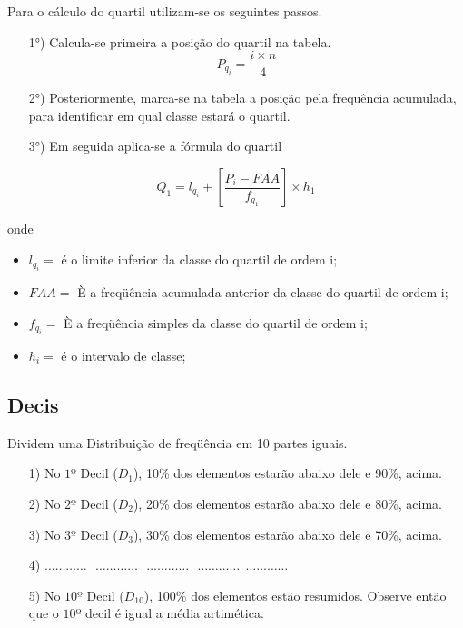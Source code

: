 Para o cálculo do quartil utilizam-se os seguintes passos.



\begin{enumerate}
\item [{1°)}]Calcula-se primeira a posição do quartil na tabela.
$$ P_{q_{i}}=\frac{i \times n}{4}$$
\item [{2°)}] Posteriormente, marca-se na tabela a posição pela frequência acumulada, para identificar em qual classe estará o quartil.
\item [{3°)}] Em seguida aplica-se a fórmula do quartil
\end{enumerate}

\begin{equation}\label{}
    Q_{1}= l_{q_{i}}+\left[\frac{P_{i}-FAA}{f_{q_{1}}}\right]\times h_{1}
\end{equation}

 onde

 \begin{itemize}
   \item $l_{q_{i}}=$ é o limite inferior da classe do quartil de ordem i;
   \item $FAA=$ È a freqüência acumulada anterior da classe do quartil de ordem i;
   \item $f_{q_{i}}=$ È a freqüência simples da classe do quartil de ordem i;
   \item $h_{i}=$ é o intervalo de classe;
 \end{itemize}




\subsection{Decis}

Dividem uma Distribuição de freqüência em 10 partes iguais.


\begin{enumerate}
  \item[{1)}] No $1º$ Decil ($D_{1}$), 10\% dos elementos estarão abaixo dele e 90\%, acima.
  \item[{2)}] No $2º$ Decil ($D_{2}$), 20\% dos elementos estarão abaixo dele e 80\%, acima.
  \item[{3)}] No $3º$ Decil ($D_{3}$), 30\% dos elementos estarão abaixo dele e 70\%, acima.
  \item[{4)}] $\ldots \ldots \ldots \ldots \ \ \  \ldots \ldots \ldots \ldots \ \ \  \ldots \ldots \ldots \ldots \ \ \  \ldots \ldots \ldots \ldots \ \ \ldots \ldots \ldots \ldots$
 \item[{5)}] No $10º$ Decil ($D_{10}$), 100\% dos elementos estão resumidos. Observe então que o $10º$ decil é igual a média artimética.
\end{enumerate}


